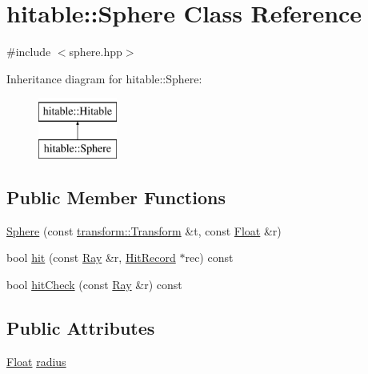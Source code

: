 \hypertarget{classhitable_1_1Sphere}{}\section{hitable\+::Sphere Class Reference}
\label{classhitable_1_1Sphere}


{\ttfamily \#include $<$sphere.\+hpp$>$}

Inheritance diagram for hitable\+::Sphere\+:\begin{figure}[H]
\begin{center}
\leavevmode
\includegraphics[height=2.000000cm]{classhitable_1_1Sphere}
\end{center}
\end{figure}
\subsection*{Public Member Functions}
\begin{DoxyCompactItemize}
\item 
\mbox{\hyperlink{classhitable_1_1Sphere_a1ebffcd034720ede81381297f5e2fe89}{Sphere}} (const \mbox{\hyperlink{classtransform_1_1Transform}{transform\+::\+Transform}} \&t, const \mbox{\hyperlink{cyclop_8hpp_a07afd7094cb489cbd514c76e6f55d34f}{Float}} \&r)
\item 
bool \mbox{\hyperlink{classhitable_1_1Sphere_ac8ff0fda7dc4914174c72ccc25728dba}{hit}} (const \mbox{\hyperlink{classRay}{Ray}} \&r, \mbox{\hyperlink{structhitable_1_1HitRecord}{Hit\+Record}} $\ast$rec) const
\item 
bool \mbox{\hyperlink{classhitable_1_1Sphere_a83c88a65d5f727af1b69e98c9ac71fa0}{hit\+Check}} (const \mbox{\hyperlink{classRay}{Ray}} \&r) const
\end{DoxyCompactItemize}
\subsection*{Public Attributes}
\begin{DoxyCompactItemize}
\item 
\mbox{\hyperlink{cyclop_8hpp_a07afd7094cb489cbd514c76e6f55d34f}{Float}} \mbox{\hyperlink{classhitable_1_1Sphere_a8c048f1afbbf72c97de9949e43c23ebb}{radius}}
\end{DoxyCompactItemize}


